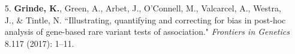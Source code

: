 \documentclass[margin]{res}
\begin{document}
\begin{resume}
\begin{itemize}
\item[5.] \textbf{Grinde, K.}, Green, A., Arbet, J., O'Connell, M., Valcarcel, A., Westra, J., \& Tintle, N. ``Illustrating, quantifying and correcting for bias in post-hoc analysis of gene-based rare variant tests of association." \textit{Frontiers in Genetics} 8.117 (2017): 1--11. 
	

\end{itemize}
\end{resume}
\end{document}
